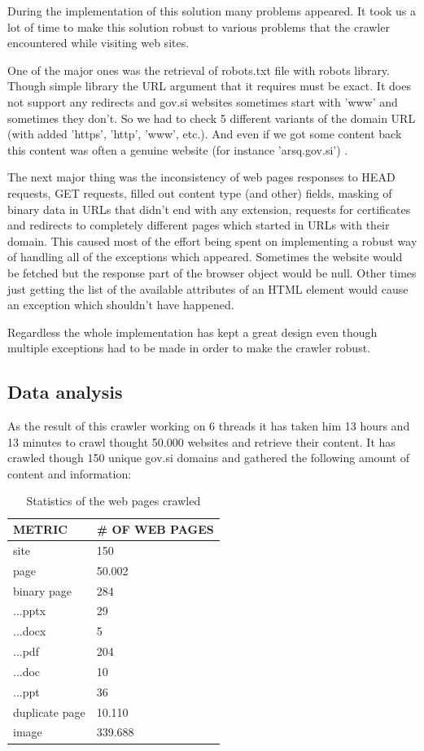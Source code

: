 \documentclass[9pt]{IEEEtran}
\begin{document}
During the implementation of this solution many problems appeared.
It took us a lot of time to make this solution robust to various problems that the crawler encountered while visiting web sites.

One of the major ones was the retrieval of robots.txt file with robots library. 
Though simple library the URL argument that it requires must be exact.
It does not support any redirects and gov.si websites sometimes start with 'www' and sometimes they don't. 
So we had to check 5 different variants of the domain URL (with added 'https', 'http', 'www', etc.).
And even if we got some content back this content was often a genuine website (for instance 'arsq.gov.si') .

The next major thing was the inconsistency of web pages responses to HEAD requests, GET requests, filled out content type (and other) fields, masking of binary data in URLs that didn't end with any extension, requests for certificates and redirects to completely different pages which started in URLs with their domain.
This caused most of the effort being spent on implementing a robust way of handling all of the exceptions which appeared. 
Sometimes the website would be fetched but the response part of the browser object would be null.
Other times just getting the list of the available attributes of an HTML element would cause an exception which shouldn't have happened.

Regardless the whole implementation has kept a great design even though multiple exceptions had to be made in order to make the crawler robust.

\subsection{Data analysis}

As the result of this crawler working on 6 threads it has taken him 13 hours and 13 minutes to crawl thought 50.000 websites and retrieve their content.
It has crawled though 150 unique gov.si domains and gathered the following amount of content and information:

\begin{table}[ht]{}
\begin{tabu} to 1.0\columnwidth { | X[l] | X[l] | }
\hline
METRIC & \# OF WEB PAGES \\
\hline
site & 150 \\
\hline
page & 50.002 \\
\hline
binary page & 284 \\
\hline
...pptx & 29 \\
\hline
...docx & 5 \\
\hline
...pdf & 204 \\
\hline
...doc & 10 \\
\hline
...ppt & 36 \\
\hline
duplicate page & 10.110 \\
\hline
image & 339.688 \\
\hline
\end{tabu}
\caption{Statistics of the web pages crawled}
\label{tab2}
\end{table}
\end{document}
